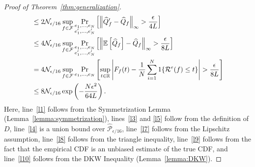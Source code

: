 \documentclass{article}
\begin{document}
\begin{proof}[Proof of Theorem~\ref{thm:generalization}]
\begin{align}
        \label{l7}
        & \leq 2 \mathcal{N}_{\epsilon/16} \sup_{f \in \mathcal{F}} \Pr_{\substack{e_1,...,e_N\\e_1',...,e_N'}} \left[ \left\| \widehat Q_f' - \widehat Q_f \right\|_\infty > \frac{\epsilon}{4L} \right] \\
        \label{l8}
        & \leq 4 \mathcal{N}_{\epsilon/16} \sup_{f \in \mathcal{F}} \Pr_{\substack{e_1,...,e_N\\e_1',...,e_N'}} \left[ \left\| \operatorname{\mathbb{E}} \left[ \widehat Q_f \right] - \widehat Q_f \right\|_\infty > \frac{\epsilon}{8L} \right] \\
        \label{l9}
        & = 4 \mathcal{N}_{\epsilon/16} \sup_{f \in \mathcal{F}} \Pr_{e_1,...,e_N} \left[ \sup_{t \in \mathbb{R}} \left| F_f(t) - \frac{1}{N} \sum_{i = 1}^N 1\{\mathcal{R}^e(f) \leq t\} \right| > \frac{\epsilon}{8L} \right] \\
        \label{l10}
        & \leq 8 \mathcal{N}_{\epsilon/16} \exp \left( - \frac{N\epsilon^2}{64L} \right).
    \end{align}
    Here, line~\eqref{l1} follows from the Symmetrization Lemma (Lemma~\ref{lemma:symmetrization}), lines~\eqref{l3} and \eqref{l5} follow from the definition of $D$, line~\eqref{l4} is a union bound over $\widehat{\mathcal{P}}_{\epsilon/16}$, line~\eqref{l7} follows from the Lipschitz assumption, line~\eqref{l8} follows from the triangle inequality, line~\eqref{l9} follows from the fact that the empirical CDF is an unbiased estimate of the true CDF, and line~\eqref{l10} follows from the DKW Inequality (Lemma~\ref{lemma:DKW}).
    

\end{proof}
\end{document}
